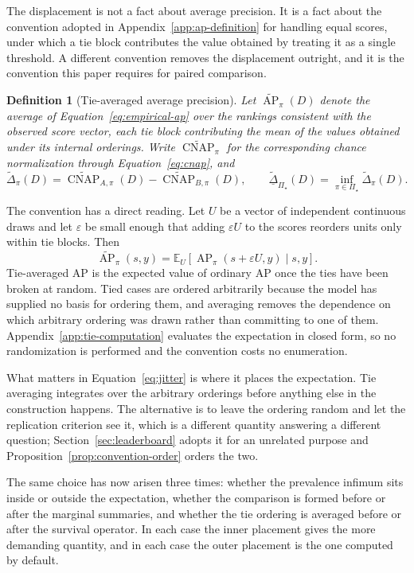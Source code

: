 \documentclass[11pt]{article}
\newcommand{\AP}{\operatorname{AP}}
\newcommand{\CNAP}{\operatorname{CNAP}}
\newcommand{\PSet}{\Pi_\star}
\newcommand{\E}{\mathbb{E}}
\newcommand{\APta}{\widetilde{\AP}}
\newcommand{\CNAPta}{\widetilde{\CNAP}}
\newcommand{\Dta}{\widetilde{\Delta}}
\newcommand{\RobDta}{\underline{\widetilde{\Delta}}_{\PSet}}
\newtheorem{definition}{Definition}
\theoremstyle{remark}
\begin{document}
The displacement is not a fact about average precision. It is a fact about the convention adopted in Appendix~\ref{app:ap-definition} for handling equal scores, under which a tie block contributes the value obtained by treating it as a single threshold. A different convention removes the displacement outright, and it is the convention this paper requires for paired comparison.

\begin{definition}[Tie-averaged average precision]
Let $\APta_\pi(D)$ denote the average of Equation~\eqref{eq:empirical-ap} over the rankings consistent with the observed score vector, each tie block contributing the mean of the values obtained under its internal orderings. Write $\CNAPta_\pi$ for the corresponding chance normalization through Equation~\eqref{eq:cnap}, and
\[
\Dta_\pi(D)
=
\CNAPta_{A,\pi}(D)-\CNAPta_{B,\pi}(D),
\qquad
\RobDta(D)
=
\inf_{\pi\in\PSet}\Dta_\pi(D).
\]
\end{definition}

The convention has a direct reading. Let $U$ be a vector of independent continuous draws and let $\varepsilon$ be small enough that adding $\varepsilon U$ to the scores reorders units only within tie blocks. Then
\begin{equation}
\APta_\pi(s,y)
=
\E_U\left[\AP_\pi(s+\varepsilon U,y)\mid s,y\right].
\label{eq:jitter}
\end{equation}
Tie-averaged AP is the expected value of ordinary AP once the ties have been broken at random. Tied cases are ordered arbitrarily because the model has supplied no basis for ordering them, and averaging removes the dependence on which arbitrary ordering was drawn rather than committing to one of them. Appendix~\ref{app:tie-computation} evaluates the expectation in closed form, so no randomization is performed and the convention costs no enumeration.

What matters in Equation~\eqref{eq:jitter} is where it places the expectation. Tie averaging integrates over the arbitrary orderings before anything else in the construction happens. The alternative is to leave the ordering random and let the replication criterion see it, which is a different quantity answering a different question; Section~\ref{sec:leaderboard} adopts it for an unrelated purpose and Proposition~\ref{prop:convention-order} orders the two.

The same choice has now arisen three times: whether the prevalence infimum sits inside or outside the expectation, whether the comparison is formed before or after the marginal summaries, and whether the tie ordering is averaged before or after the survival operator. In each case the inner placement gives the more demanding quantity, and in each case the outer placement is the one computed by default.
\end{document}
